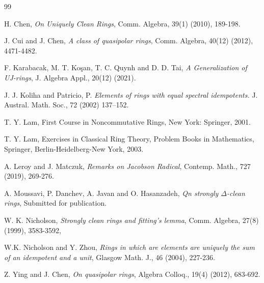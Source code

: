 \documentclass[12pt, reqno]{amsart}
\numberwithin{equation}{section}
\begin{document}
\begin{thebibliography}{99}

 H. Chen, \textit{On Uniquely Clean Rings}, Comm. Algebra, 39(1) (2010), 189-198.

 J. Cui and J. Chen, {\it A class of quasipolar rings}, Comm. Algebra, 40(12) (2012), 4471-4482. 

 F. Karabacak, M. T. Koşan, T. C. Quynh and D. D. Tai, {\textit{A Generalization of UJ-rings}}, J. Algebra Appl., 20(12) (2021).

 J. J. Koliha and Patricio, P. {\textit{ Elements of rings with equal spectral idempotents.}}
J. Austral. Math. Soc., 72 (2002) 137–152. 

  T. Y. Lam,  First Course in Noncommutative Rings, New York: Springer, 2001.

 T. Y. Lam, Exercises in Classical Ring Theory, Problem Books in Mathematics, Springer, Berlin-Heidelberg-New York, 2003.

 A. Leroy and J. Matczuk, {\it Remarks on Jacobson Radical}, Contemp. Math., 727 (2019), 269-276.

 A. Moussavi, P. Danchev, A. Javan and O. Hasanzadeh, {\textit{Qn strongly $\Delta$-clean rings}}, Submitted for publication.

 W. K. Nicholson, {\textit{Strongly clean rings and fitting’s lemma}}, Comm. Algebra, 27(8) (1999), 3583-3592,

 W.K. Nicholson and Y. Zhou, {\textit{Rings in which are elements are uniquely the sum of an idempotent and a unit}}, Glasgow Math. J., 46 (2004), 227-236.




 Z. Ying and J. Chen, {\textit{On quasipolar rings}}, Algebra Colloq., 19(4) (2012), 683-692.

\end{thebibliography}
\end{document}
